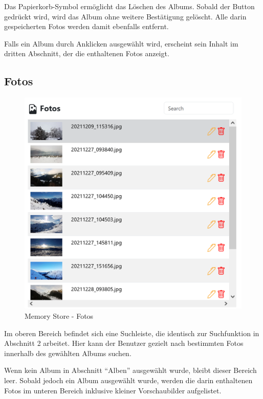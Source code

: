 Das Papierkorb-Symbol ermöglicht das Löschen des Albums. Sobald der Button gedrückt 
wird, wird das Album ohne weitere Bestätigung gelöscht. Alle darin gespeicherten 
Fotos werden damit ebenfalls entfernt.

Falls ein Album durch Anklicken ausgewählt wird, erscheint sein Inhalt im dritten 
Abschnitt, der die enthaltenen Fotos anzeigt.

\subsection{Fotos}

\begin{figure} [h t]
    \centering
    \includegraphics[scale=0.6]{pics/memory_store_teil3.PNG}
    \caption{Memory Store - Fotos}
    \label{fig:memory-store-fotos}
\end{figure}

Im oberen Bereich befindet sich eine Suchleiste, die identisch zur Suchfunktion in 
Abschnitt 2 arbeitet. Hier kann der Benutzer gezielt nach bestimmten Fotos innerhalb 
des gewählten Albums suchen.

Wenn kein Album in Abschnitt ``Alben'' ausgewählt wurde, bleibt dieser Bereich leer. 
Sobald jedoch ein Album ausgewählt wurde, werden die darin enthaltenen Fotos im 
unteren Bereich inklusive kleiner Vorschaubilder aufgelistet.

